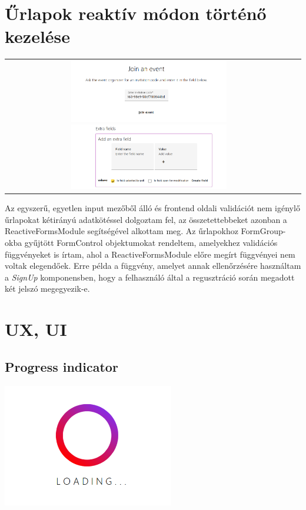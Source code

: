 \documentclass[a4paper,12pt]{report}
\theoremstyle{definition}
\theoremstyle{remark}
\begin{document}
\section{Űrlapok reaktív módon történő kezelése}

\begin{center}
\begin{tabular}{cc}
\includegraphics[width=70mm]{join_event}
\includegraphics[width=70mm]{extra_field_form}
\end{tabular}
\captionsetup{width=0.8\linewidth}
\end{center}

Az egyszerű, egyetlen input mezőből álló és frontend oldali validációt nem igénylő űrlapokat kétirányú adatkötéssel dolgoztam fel, az összetettebbeket azonban a ReactiveFormsModule\cite{ReactiveFormswebsite} segítségével alkottam meg. Az űrlapokhoz FormGroup-okba gyűjtött FormControl objektumokat rendeltem, amelyekhez validációs függvényeket is írtam, ahol a ReactiveFormsModule előre megírt függvényei nem voltak elegendőek. Erre példa a függvény, amelyet annak ellenőrzésére használtam a  \textit{SignUp} komponensben, hogy a felhasználó által a regusztráció során megadott két jelszó megegyezik-e.

\section{UX, UI}

	\subsection{Progress indicator}

\begin{center}
\includegraphics[width=75mm]{progress_indicator}
\captionsetup{width=0.8\linewidth}
\end{center}
\end{document}

